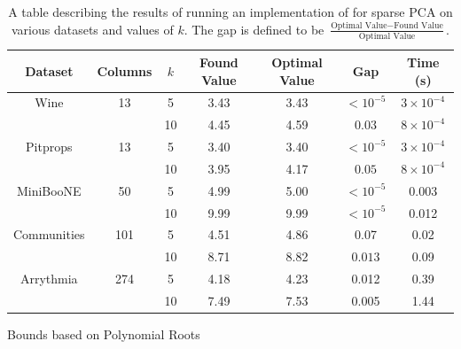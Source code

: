 \documentclass{beamer}
\begin{document}
\begin{frame}
    \tiny{
\begin{table}[H]
\begin{center}
    \begin{tabular}{c|c c c c c c}
        Dataset & Columns & $k$ & Found Value & Optimal Value & Gap & Time (s)\\
        \hline
        Wine & 13 & 5 & 3.43 & 3.43 & $<10^{-5}$ & $3\times 10^{-4}$\\
             &    & 10 & 4.45 & 4.59 & $0.03$ & $8\times 10^{-4}$\\
        \hline
        Pitprops & 13 & 5 & 3.40 & 3.40 & $<10^{-5}$ & $3\times 10^{-4}$\\
             &    & 10 & 3.95 & 4.17 & $0.05$ & $8\times 10^{-4}$\\
        \hline
        MiniBooNE & 50 & 5 & 4.99 & 5.00 & $<10^{-5}$ & 0.003\\
             &    & 10 & 9.99 & 9.99 & $<10^{-5}$ & 0.012\\
        \hline
        Communities & 101 & 5 & 4.51 & 4.86 & 0.07 & 0.02 \\
             &    & 10 & 8.71 & 8.82 & $0.013$ & 0.09\\
        \hline
        Arrythmia & 274 & 5 & 4.18 & 4.23 & 0.012 & 0.39\\
         & & 10 & 7.49 & 7.53 & 0.005 & 1.44
    \end{tabular}

\end{center}
\caption{A table describing the results of running an implementation of  for sparse PCA on various datasets and values of $k$.  The gap is defined to be $\frac{\text{Optimal Value} - \text{Found Value}}{\text{Optimal Value}}$.}
\end{table}}
\end{frame}
\begin{frame}
    \centering
    \huge
    {\color{gray}Bounds based on Polynomial Roots}
\end{frame}
\end{document}
